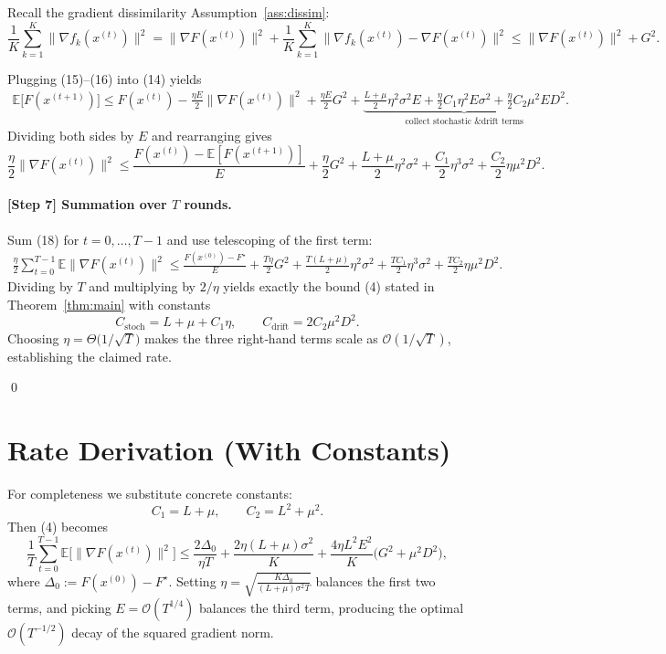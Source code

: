 \documentclass[11pt]{article}
\newcommand{\E}{\mathbb{E}}
\begin{document}
Recall the gradient dissimilarity Assumption~\ref{ass:dissim}:
\[
\frac{1}{K}\sum_{k=1}^{K}\bigl\|\nabla f_k(x^{(t)})\bigr\|^2
= \bigl\|\nabla F(x^{(t)})\bigr\|^2 + \frac{1}{K}\sum_{k=1}^{K}
\bigl\|\nabla f_k(x^{(t)})-\nabla F(x^{(t)})\bigr\|^2
\le \bigl\|\nabla F(x^{(t)})\bigr\|^2 + G^2 .
\tag{16}
\]

Plugging (15)–(16) into (14) yields
\begin{align}
\E\bigl[F(x^{(t+1)})\bigr]
\le
F(x^{(t)}) 
-\frac{\eta E}{2}\bigl\|\nabla F(x^{(t)})\bigr\|^2
+ \frac{\eta E}{2}G^2
+ \underbrace{\frac{L+\mu}{2}\eta^2\sigma^2 E
+ \frac{\eta}{2}C_1\eta^2 E\sigma^2
+ \frac{\eta}{2}C_2\mu^2 E D^2}_{\text{collect stochastic \& drift terms}} .
\tag{17}
\end{align}
Dividing both sides by $E$ and rearranging gives
\[
\frac{\eta}{2}\bigl\|\nabla F(x^{(t)})\bigr\|^2
\le
\frac{F(x^{(t)})- \E[F(x^{(t+1)})]}{E}
+ \frac{\eta}{2}G^2
+ \frac{L+\mu}{2}\eta^2\sigma^2
+ \frac{C_1}{2}\eta^3\sigma^2
+ \frac{C_2}{2}\eta\mu^2 D^2 .
\tag{18}
\]

\paragraph{[Step 7] Summation over $T$ rounds.}
Sum (18) for $t=0,\dots,T-1$ and use telescoping of the first term:
\begin{align}
\frac{\eta}{2}\sum_{t=0}^{T-1}\E\bigl\|\nabla F(x^{(t)})\bigr\|^2
\le
\frac{F(x^{(0)})-F^\star}{E}
+ \frac{T\eta}{2}G^2
+ \frac{T(L+\mu)}{2}\eta^2\sigma^2
+ \frac{TC_1}{2}\eta^3\sigma^2
+ \frac{TC_2}{2}\eta\mu^2 D^2 .
\tag{19}
\end{align}
Dividing by $T$ and multiplying by $2/\eta$ yields exactly the bound (4) stated in Theorem~\ref{thm:main} with constants
\[
C_{\text{stoch}}=L+\mu+C_1\eta,\qquad 
C_{\text{drift}}=2C_2\mu^2 D^2 .
\]
Choosing $\eta = \Theta\!\bigl(1/\sqrt{T}\bigr)$ makes the three right‑hand terms scale as $\mathcal{O}(1/\sqrt{T})$, establishing the claimed rate.

\qed

\section*{Rate Derivation (With Constants)}
For completeness we substitute concrete constants:
\[
C_1 = L+\mu,\qquad C_2 = L^2+\mu^2 .
\]
Then (4) becomes
\[
\frac{1}{T}\sum_{t=0}^{T-1}\E\bigl[\|\nabla F(x^{(t)})\|^2\bigr]
\le
\frac{2\Delta_0}{\eta T}
+ \frac{2\eta (L+\mu)\sigma^2}{K}
+ \frac{4\eta L^2E^2}{K}\bigl(G^2+\mu^2 D^2\bigr),
\]
where $\Delta_0:=F(x^{(0)})-F^\star$.
Setting $\eta=\sqrt{\frac{K\Delta_0}{(L+\mu)\sigma^2 T}}$ balances the first two terms,
and picking $E= \mathcal{O}(T^{1/4})$ balances the third term,
producing the optimal $\mathcal{O}(T^{-1/2})$ decay of the squared gradient norm.
\end{document}
